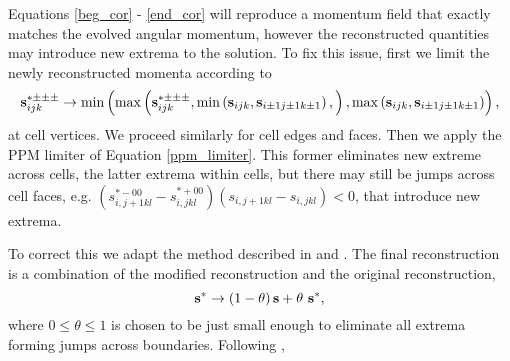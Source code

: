 \documentclass{aastex63}
\begin{document}
Equations \ref{beg_cor} - \ref{end_cor} will reproduce a momentum field that exactly matches the evolved angular momentum, however the reconstructed quantities may introduce new extrema to the solution. To fix this issue, first we limit the newly reconstructed momenta according to
\begin{equation}
\vect{s}^{* \pm\pm\pm}_{i j k} \rightarrow
\mathrm{min}\left(
\mathrm{max}\left(
\vect{s}^{* \pm\pm\pm}_{i j k},
\mathrm{min}\left(\vect{s}_{i j k}, \vect{s}_{i\pm 1 j \pm 1 k\pm 1}\right), 
\right), \mathrm{max}\left(\vect{s}_{i j k}, \vect{s}_{i\pm 1 j \pm 1 k\pm 1}\right) \right),
\end{equation}
at cell vertices. We proceed similarly for cell edges and faces.
Then we apply the PPM limiter of Equation \ref{ppm_limiter}. This former eliminates new extreme across cells, the latter extrema within cells, but there may still be jumps across cell faces, e.g.
$\left(s^{* - 0 0}_{i, j + 1 k l} - s^{* + 0 0}_{i, j k l} \right)\left(s_{i,  j + 1 k l} - s_{i, j k l}\right) < 0$, that introduce new extrema.

To correct this we adapt the method described in \cite{Kurganov2001} and \cite{Liu1998}. The final reconstruction is a combination of the modified reconstruction and the original reconstruction,
\begin{equation}
\vect{s}^{*} \rightarrow \left(1 - \theta\right) \vect{s}  + \theta \ \vect{s}^{*},
\end{equation}
where $0 \le \theta \le 1$ is chosen to be just small enough to eliminate all extrema forming jumps across boundaries. Following \cite{Kurganov2001} , 









\end{document}
